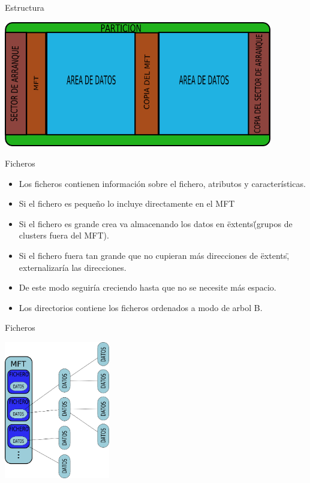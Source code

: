 \begin{frame}{Estructura}
  \begin{center}
    \includegraphics[height=5.5cm]{imgs/ntfs_struct.png}
  \end{center}
\end{frame}

\begin{frame}{Ficheros}
  \begin{itemize}
    \item Los ficheros contienen información sobre el fichero, atributos y características.
    \item Si el fichero es pequeño lo incluye directamente en el MFT
    \item Si el fichero es grande crea va almacenando los datos en \"extents\" (grupos de clusters fuera del MFT).
    \item Si el fichero fuera tan grande que no cupieran más direcciones de \"extents\", externalizaría las direcciones.
    \item De este modo seguiría creciendo hasta que no se necesite más espacio.
    \item Los directorios contiene los ficheros ordenados a modo de arbol B.
  \end{itemize}
\end{frame}

\begin{frame}{Ficheros}
  \begin{center}
    \includegraphics[height=6cm]{imgs/ntfs_files.png}
  \end{center}
\end{frame}
